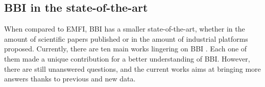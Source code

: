 \subsection{BBI in the state-of-the-art}
	When compared to EMFI, BBI has a smaller state-of-the-art, whether in the amount of scientific papers published or in the amount of industrial platforms proposed.
	Currently, there are ten main works lingering on BBI \cite{bbiOrigin, bbiSecond, bbiThird, bbiColin,japbbi, japbbi2, mybbiCosade, mybbiFdtc2022, mybbifdtc2023, colinFdtc2023}.
	Each one of them made a unique contribution for a better understanding of BBI.
	However, there are still unanswered questions, and the current works aims at bringing more answers thanks to previous and new data.
